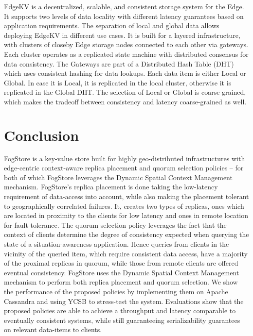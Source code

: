 \par EdgeKV \cite{edgekv} is a decentralized, scalable, and consistent storage system for the Edge. It supports two levels of data locality with different latency guarantees based on application requirements. The separation of local and global data allows deploying EdgeKV in different use cases. It is built for a layered infrastructure, with clusters of closeby Edge storage nodes connected to each other via gateways. Each cluster operates as a replicated state machine with distributed consensus for data consistency. The Gateways are part of a Distributed Hash Table (DHT) which uses consistent hashing for data lookups. Each data item is either Local or Global. In case it is Local, it is replicated in the local cluster, otherwise it is replicated in the Global DHT. The selection of Local or Global is coarse-grained, which makes the tradeoff between consistency and latency coarse-grained as well.



\section{Conclusion}
\label{sec:conclusion}
FogStore is a key-value store built for highly geo-distributed infrastructures with edge-centric context-aware replica placement and quorum selection policies -- for both of which FogStore leverages the Dynamic Spatial Context Management mechanism. FogStore's replica placement is done taking the low-latency requirement of data-access into account, while also making the placement tolerant to geographically correlated failures. It, creates two types of replicas, ones which are located in proximity to the clients for low latency and ones in remote location for fault-tolerance. The quorum selection policy leverages the fact that the context of clients determine the degree of consistency expected when querying the state of a situation-awareness application. Hence queries from clients in the vicinity of the queried item, which require consistent data access, have a majority of the proximal replicas in quorum, while those from remote clients are offered eventual consistency. FogStore uses the Dynamic Spatial Context Management mechanism to perform both replica placement and quorum selection. We show the performance of the proposed policies by implementing them on Apache Cassandra and using YCSB to stress-test the system. Evaluations show that the proposed policies are able to achieve a throughput and latency comparable to eventually consistent systems, while still guaranteeing serializability guarantees on relevant data-items to clients.